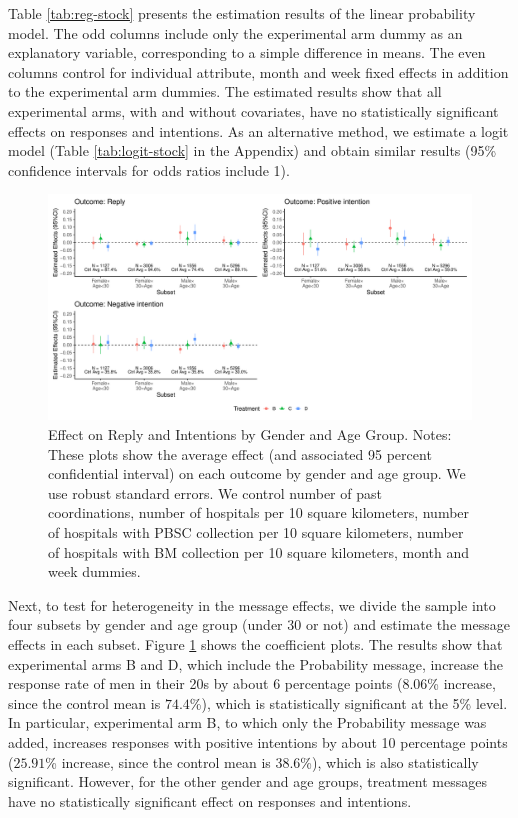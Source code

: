 \documentclass[
]{article}
\begin{document}
Table \ref{tab:reg-stock} presents the estimation results of the linear probability model. The odd columns include only the experimental arm dummy as an explanatory variable, corresponding to a simple difference in means. The even columns control for individual attribute, month and week fixed effects in addition to the experimental arm dummies. The estimated results show that all experimental arms, with and without covariates, have no statistically significant effects on responses and intentions. As an alternative method, we estimate a logit model (Table \ref{tab:logit-stock} in the Appendix) and obtain similar results (95\% confidence intervals for odds ratios include 1).

\begin{figure}[t]
\includegraphics{robustness-body_files/figure-latex/coefplot-reg-stock-subset-1} \caption{Effect on Reply and Intentions by Gender and Age Group. Notes: These plots show the average effect (and associated 95 percent confidential interval) on each outcome by gender and age group. We use robust standard errors. We control number of past coordinations, number of hospitals per 10 square kilometers, number of hospitals with PBSC collection per 10 square kilometers, number of hospitals with BM collection per 10 square kilometers, month and week dummies.}\label{fig:coefplot-reg-stock-subset}
\end{figure}

Next, to test for heterogeneity in the message effects, we divide the sample into four subsets by gender and age group (under 30 or not) and estimate the message effects in each subset. Figure \ref{fig:coefplot-reg-stock-subset} shows the coefficient plots. The results show that experimental arms B and D, which include the Probability message, increase the response rate of men in their 20s by about 6 percentage points (\(8.06\)\% increase, since the control mean is \(74.4\)\%), which is statistically significant at the 5\% level. In particular, experimental arm B, to which only the Probability message was added, increases responses with positive intentions by about 10 percentage points (\(25.91\)\% increase, since the control mean is \(38.6\)\%), which is also statistically significant. However, for the other gender and age groups, treatment messages have no statistically significant effect on responses and intentions.
\end{document}
